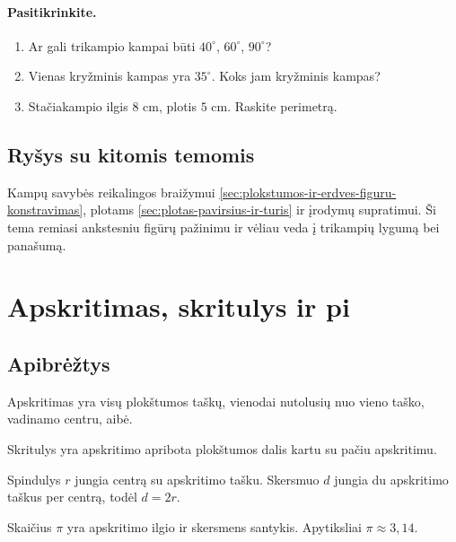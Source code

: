 \paragraph{Pasitikrinkite.}
\begin{enumerate}[label=\arabic*.]
\item Ar gali trikampio kampai būti \(40^\circ\), \(60^\circ\), \(90^\circ\)?
\item Vienas kryžminis kampas yra \(35^\circ\). Koks jam kryžminis kampas?
\item Stačiakampio ilgis \(8\) cm, plotis \(5\) cm. Raskite perimetrą.
\end{enumerate}

\subsection{Ryšys su kitomis temomis}
Kampų savybės reikalingos braižymui \ref{sec:plokstumos-ir-erdves-figuru-konstravimas}, plotams \ref{sec:plotas-pavirsius-ir-turis} ir įrodymų supratimui. Ši tema remiasi ankstesniu figūrų pažinimu ir vėliau veda į trikampių lygumą bei panašumą.

\section{Apskritimas, skritulys ir pi}\label{sec:apskritimas-skritulys-ir-pi}

\subsection{Apibrėžtys}
\begin{apibreztis}
Apskritimas yra visų plokštumos taškų, vienodai nutolusių nuo vieno taško, vadinamo centru, aibė.
\end{apibreztis}
\begin{apibreztis}
Skritulys yra apskritimo apribota plokštumos dalis kartu su pačiu apskritimu.
\end{apibreztis}
\begin{apibreztis}
Spindulys \(r\) jungia centrą su apskritimo tašku. Skersmuo \(d\) jungia du apskritimo taškus per centrą, todėl \(d=2r\).
\end{apibreztis}
\begin{apibreztis}
Skaičius \(\pi\) yra apskritimo ilgio ir skersmens santykis. Apytiksliai \(\pi\approx 3,14\).
\end{apibreztis}

